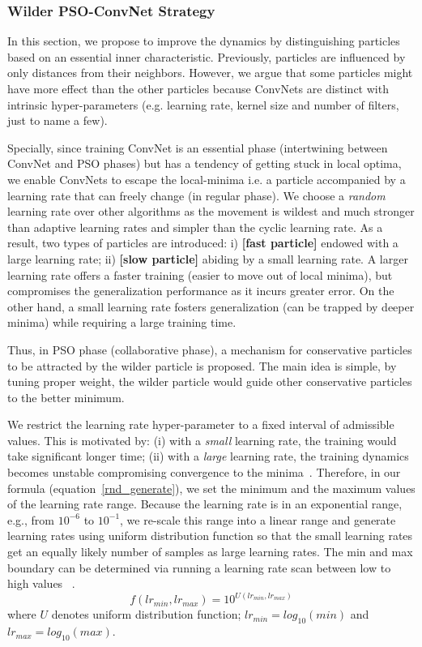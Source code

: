 \documentclass{ieeeaccess}
\begin{document}
\subsubsection{Wilder PSO-ConvNet Strategy}
\label{sec:randomlrs}
In this section, we propose to improve the dynamics by distinguishing particles based on an essential inner characteristic. Previously, particles are influenced by only distances from their neighbors. However, we argue that some particles might have more effect than the other particles because ConvNets are distinct with intrinsic hyper-parameters (e.g. learning rate, kernel size and number of filters, just to name a few).

Specially, since training ConvNet is an essential phase (intertwining between ConvNet and PSO phases) but has a tendency of getting stuck in local optima, we enable ConvNets to escape the local-minima i.e. a particle accompanied by a learning rate that can freely change (in regular phase). We choose a \textit{random} learning rate over other algorithms as the movement is wildest and much stronger than adaptive learning rates and simpler than the cyclic learning rate. As a result, two types of particles are introduced: i) \textbf{[fast particle]} endowed with a large learning rate; ii) \textbf{[slow particle]} abiding by a small learning rate. A larger learning rate offers a faster training (easier to move out of local minima), but compromises the generalization performance as it incurs greater error. On the other hand, a small learning rate fosters generalization (can be trapped by deeper minima) while requiring a large training time.

Thus, in PSO phase (collaborative phase), a mechanism for conservative particles to be attracted by the wilder particle is proposed. The main idea is simple, by tuning proper weight, the wilder particle would guide other conservative particles to the better minimum.

We restrict the learning rate hyper-parameter to a fixed interval of admissible values. This is motivated by: (i) with a \textit{small} learning rate, the training would take significant longer time; (ii) with a \textit{large} learning rate, the training dynamics becomes unstable compromising convergence to the minima~\cite{hanin2018neural,hochreiter1991untersuchungen}. Therefore, in our formula (equation~\eqref{rnd_generate}), we set the minimum and the maximum values of the learning rate range. Because the learning rate is in an exponential range, e.g., from $10^{-6}$ to $10^{-1}$, we re-scale this range into a linear range and generate learning rates using uniform distribution function so that the small learning rates get an equally likely number of samples as large learning rates. The min and max boundary can be determined via running a learning rate scan between low to high values ~\cite{smith2017cyclical}.
\begin{equation}
\label{rnd_generate}
f(lr_{min},lr_{max})= 10^{U(lr_{min},lr_{max})}
\end{equation}
where $U$ denotes uniform distribution function; $lr_{min}=log_{10}(min)$ and $lr_{max}=log_{10}(max)$.
\end{document}
